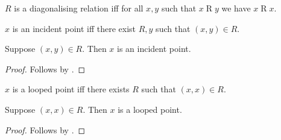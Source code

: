 \begin{definition}\label{reduced_diagonal}
    $R$ is a diagonalising relation iff for all $x,y$ such that $x\mathrel{R}y$
    we have $x\mathrel{R}x$.
\end{definition}

\begin{definition}\label{reduced_incident}
    $x$ is an incident point iff there exist $R,y$ such that $(x,y)\in R$.
\end{definition}

\begin{classification}\label{reduced_incident_intro}
    Suppose $(x,y)\in R$.
    Then $x$ is an incident point.
\end{classification}
\begin{proof}
    Follows by .
\end{proof}

\begin{definition}\label{reduced_loop}
    $x$ is a looped point iff there exists $R$ such that $(x,x)\in R$.
\end{definition}

\begin{classification}\label{reduced_loop_intro}
    Suppose $(x,x)\in R$.
    Then $x$ is a looped point.
\end{classification}
\begin{proof}
    Follows by .
\end{proof}
